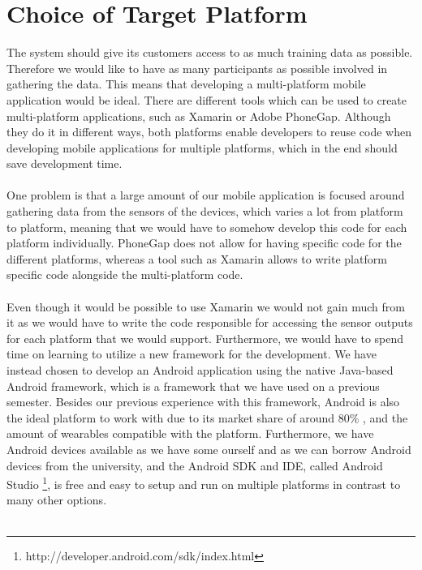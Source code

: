 
\section{Choice of Target Platform}
\label{sec:choice_of_platform}

The system should give its customers access to as much training data as possible. Therefore we would like to have as many participants as possible involved in gathering the data. This means that developing a multi-platform mobile application would be ideal. There are different tools which can be used to create multi-platform applications, such as Xamarin or Adobe PhoneGap. Although they do it in different ways, both platforms enable developers to reuse code when developing mobile applications for multiple platforms, which in the end should save development time. 
\\\\
One problem is that a large amount of our mobile application is focused around gathering data from the sensors of the devices, which varies a lot from platform to platform, meaning that we would have to somehow develop this code for each platform individually. PhoneGap does not allow for having specific code for the different platforms, whereas a tool such as Xamarin allows to write platform specific code alongside the multi-platform code. 
\\\\
Even though it would be possible to use Xamarin we would not gain much from it as we would have to write the code responsible for accessing the sensor outputs for each platform that we would support. Furthermore, we would have to spend time on learning to utilize a new framework for the development. We have instead chosen to develop an Android application using the native Java-based Android framework, which is a framework that we have used on a previous semester. Besides our previous experience with this framework, Android is also the ideal platform to work with due to its market share of around 80\% \parencite{android_os_market_share}, and the amount of wearables compatible with the platform. Furthermore, we have Android devices available as we have some ourself and as we can borrow Android devices from the university, and the Android SDK and IDE, called Android Studio \footnote{http://developer.android.com/sdk/index.html}, is free and easy to setup and run on multiple platforms in contrast to many other options.
\\\\
